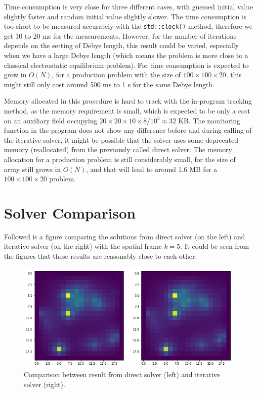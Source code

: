 \documentclass{article}
\begin{document}
\begin{spacing}{1.1}
Time consumption is very close for three different cases, with guessed initial value slightly faster and random initial value slightly slower. The time consumption is too short to be measured accurately with the \texttt{std::clock()} method, therefore we get 10 to 20 ms for the measurements. However, for the number of iterations depends on the setting of Debye length, this result could be varied, especially when we have a large Debye length (which means the problem is more close to a classical electrostatic equilibrium problem). For time consumption is expected to grow in $O(N)$, for a production problem with the size of $100\times 100\times 20$, this might still only cost around 500 ms to 1 s for the same Debye length.

Memory allocated in this procedure is hard to track with the in-program tracking method, as the memory requirement is small, which is expected to be only a cost on an auxiliary field occupying $20 \times 20\times 10\times 8/10^3\approx 32$ KB. The monitoring function in the program does not show any difference before and during calling of the iterative solver, it might be possible that the solver uses some deprecated memory (reallocated) from the previously called direct solver. The memory allocation for a production problem is still considerably small, for the size of array still grows in $O(N)$, and that will lead to around 1.6 MB for a $100\times 100\times 20$ problem.

\section{Solver Comparison}

Followed is a figure comparing the solutions from direct solver (on the left) and iterative solver (on the right) with the spatial frame $k=5$. It could be seen from the figures that these results are reasonably close to each other.

\begin{figure}[H]
  \includegraphics[width=\linewidth]{../output/testcase.png}
  \caption{Comparison between result from direct solver (left) and iterative solver (right).}
  \label{fig-testcase}
\end{figure}


\end{spacing}
\end{document}
